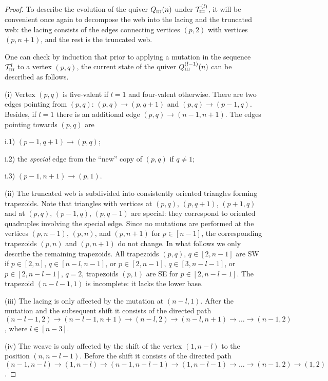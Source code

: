 \documentclass{amsart}
\theoremstyle{definition}
\theoremstyle{remark}
\numberwithin{equation}{section}
\numberwithin{theorem}{section}
\begin{document}
\begin{proof}
To describe the evolution of the quiver $Q_{\mbox{\tiny\rm III}}(n)$ under ${{\mathcal T}}^{(l)}_{\mbox{\tiny\rm III}}$, it will be convenient once again to decompose the web into 
the lacing and the truncated web: the lacing consists of the edges connecting vertices $(p,2)$ with vertices $(p,n+1)$, 
and the rest is the truncated web. 

One can check by induction that prior to applying a mutation in the sequence ${{\mathcal T}}^l_{\mbox{\tiny\rm III}}$ to a vertex $(p,q)$, the current state of the quiver $Q^{(l-1)}_{\mbox{\tiny\rm III}}(n)$ can be described as follows. 

(i) Vertex $(p,q)$ is five-valent if $l=1$ and four-valent otherwise.
There are two edges pointing from $(p,q)$: $(p,q) \to (p,q+1)$ and $(p,q)\to (p-1,q)$.
Besides, if $l=1$ there is an additional edge $(p,q) \to (n-1,n+1)$.
The edges pointing towards $(p,q)$ are

i.1) $(p-1,q+1)\to (p,q)$;

i.2) the {\it special\/} edge from the ``new'' copy of $(p,q)$ if $q\ne 1$; 

i.3) $(p-1,n+1)\to (p,1)$.

(ii) The truncated web is subdivided into consistently oriented triangles forming 
trapezoids. Note that triangles with vertices at $(p,q)$, $(p,q+1)$, $(p+1,q)$
and at $(p,q)$, $(p-1,q)$, $(p,q-1)$ are special: they correspond to oriented quadruples involving
the special edge.
Since no mutations are performed at the vertices $(p,n-1)$, $(p,n)$, and $(p,n+1)$ for $p\in [n-1]$,
the corresponding trapezoids $(p,n)$ and $(p,n+1)$ do not change. In what follows we only
describe the remaining trapezoids.
All trapezoids $(p,q)$, $q\in [2,n-1]$ are SW if $p\in [2,n]$, $q\in [n-l,n-1]$, or $p\in [2,n-1]$, 
$q\in [3,n-l-1]$, or $p\in [2,n-l-1]$, $q=2$, trapezoids $(p,1)$ are SE
for $p\in [2,n-l-1]$.
The trapezoid 
$(n-l-1,1)$  is incomplete: 
it lacks the lower base. 
  
 (iii) The lacing is only affected by the mutation at $(n-l,1)$. 
After the mutation and the subsequent shift it consists of
 the directed path
$(n-l-1,2)\to (n-l-1,n+1)\to (n-l,2) \to (n-l,n+1)\to\ldots \to (n-1,2)$, where $l\in [n-3]$.   
  
(iv) The weave is only affected by the shift of the vertex $(1,n-l)$ to the position $(n,n-l-1)$. 
Before the shift it consists of the directed path 
$(n-1,n-l)\to(1,n-l)\to(n-1,n-l-1)\to (1,n-l-1)\to \ldots \to(n-1,2) \to (1,2)$.


\end{proof}
\end{document}
